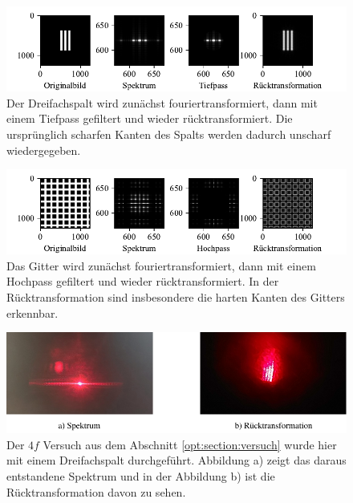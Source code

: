 \begin{figure}
    \centering
    \includegraphics[width=\textwidth]{papers/opt/images/dreifachspalt_tiefpass.pdf}
    \caption{Der Dreifachspalt wird zunächst fouriertransformiert, dann mit einem Tiefpass gefiltert und wieder rücktransformiert.
    Die ursprünglich scharfen Kanten des Spalts werden dadurch unscharf wiedergegeben.}
    \label{opt:fig:three_slit_simulation}
\end{figure}

\begin{figure}
    \centering
    \includegraphics[width=\textwidth]{papers/opt/images/gitter_hochpass.pdf}
    \caption{Das Gitter wird zunächst fouriertransformiert, dann mit einem Hochpass gefiltert und wieder rücktransformiert.
    In der Rücktransformation sind insbesondere die harten Kanten des Gitters erkennbar.}
    \label{opt:fig:grid_simulation}
\end{figure}

\begin{figure}
    \centering
    \includegraphics[width=\textwidth]{papers/opt/images/experiment.pdf}
    \caption{Der $4f$ Versuch aus dem Abschnitt \ref{opt:section:versuch} wurde hier mit einem Dreifachspalt durchgeführt.
    Abbildung a) zeigt das daraus entstandene Spektrum und in der Abbildung b) ist die Rücktransformation davon zu sehen.}
    \label{opt:fig:experiment}
\end{figure}

